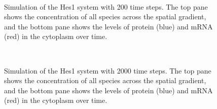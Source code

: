 \documentclass{bioinfo}
\begin{document}
\begin{figure}[t]
  \begin{center}
     \\
  \end{center}
  \caption{Simulation of the Hes1 system with 200 time steps. The top pane shows the concentration of all species across the spatial gradient, and the bottom pane shows the levels of protein (blue) and mRNA (red) in the cytoplasm over time.}
\end{figure}
\begin{figure}
  \begin{center}
     \\
  \end{center}
  \caption{Simulation of the Hes1 system with 2000 time steps. The top pane shows the concentration of all species across the spatial gradient, and the bottom pane shows the levels of protein (blue) and mRNA (red) in the cytoplasm over time.}
\end{figure}
\end{document}
